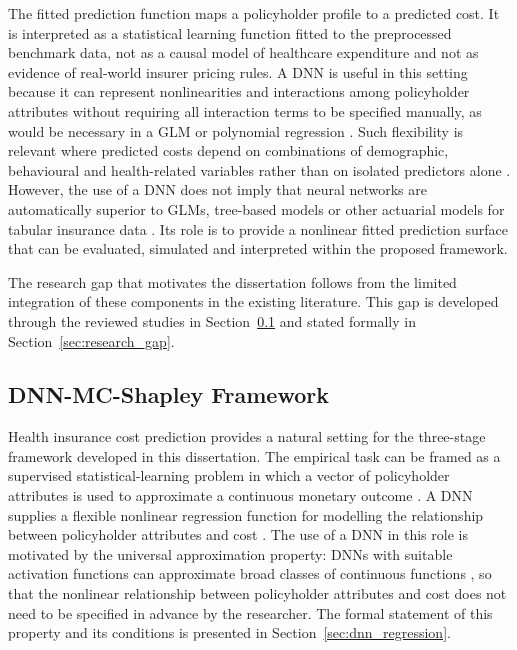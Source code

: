 \noindent
The fitted prediction function maps a policyholder profile to a predicted
cost.  It is interpreted as a statistical learning function fitted to the
preprocessed benchmark data, not as a causal model of healthcare expenditure and
not as evidence of real-world insurer pricing rules.  A DNN is useful
in this setting because it can represent nonlinearities and interactions among
policyholder attributes without requiring all interaction terms to be specified
manually, as would be necessary in a GLM or polynomial
regression \citep{goodfellow2016deep, hastie2009elements}.  Such flexibility is
relevant where predicted costs depend on combinations of demographic,
behavioural and health-related variables rather than on isolated predictors
alone \citep{orji2024explainable, samiuddin2023health}.  However, the use of a
DNN does not imply that neural networks are automatically superior to
GLMs, tree-based models or other actuarial models for
tabular insurance data \citep{richman2021ai}.  Its role is to provide a nonlinear
fitted prediction surface that can be evaluated, simulated and interpreted
within the proposed framework.

\noindent
The research gap that motivates the dissertation follows from the limited
integration of these components in the existing literature.  This gap is
developed through the reviewed studies in
Section~\ref{sec:integrating_dnn_mc_shapley} and stated formally in
Section~\ref{sec:research_gap}.


\subsection{DNN-MC-Shapley Framework}
\label{sec:integrating_dnn_mc_shapley}

\noindent
Health insurance cost prediction provides a natural setting for the
three-stage framework developed in this dissertation.  The empirical task
can be framed as a supervised statistical-learning problem in which a vector
of policyholder attributes is used to approximate a continuous monetary
outcome \citep{hastie2009elements, james2021introduction}.  A DNN
supplies a flexible nonlinear regression function for modelling the
relationship between policyholder attributes and cost
\citep{goodfellow2016deep, hornik1989multilayer, richman2021ai,
samiuddin2023health}.  The use of a DNN in this role is motivated by
the universal approximation property: DNNs with
suitable activation functions can approximate broad classes of continuous
functions \citep{hornik1989multilayer, goodfellow2016deep}, so that the
nonlinear relationship between policyholder attributes and cost does not
need to be specified in advance by the researcher.  The formal statement of
this property and its conditions is presented in
Section~\ref{sec:dnn_regression}.

